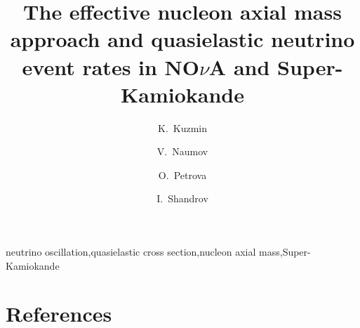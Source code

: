 \documentclass[preprint]{elsarticle}
\begin{document}
\begin{frontmatter}

\title{The effective nucleon axial mass approach and quasielastic neutrino event rates in NO$\nu$A and Super-Kamiokande}

\author[ITEP,JINR]{K.~Kuzmin}

\author[JINR]{V.~Naumov}

\author[JINR]{O.~Petrova}

\author[JINR]{I.~Shandrov}

\address[ITEP]{Institute for Theoretical and Experimental Physics, Bolshaya Cheremushkinskaya 25, RU-117218 Moscow, Russia}
\address[JINR]{Joint Institute for Nuclear Research, Joliot-Curie 6, RU-141980 Dubna, Russia}

\begin{abstract}

\end{abstract}

\begin{keyword}
neutrino oscillation\sep quasielastic cross section\sep nucleon axial mass\sep Super-Kamiokande
\end{keyword}

\end{frontmatter}

\linenumbers






\section*{References}

\end{document}
